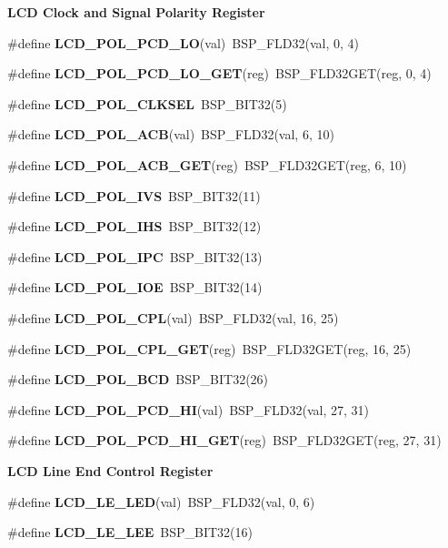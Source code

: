\begin{Indent}\textbf{ L\+CD Clock and Signal Polarity Register}\par
\begin{DoxyCompactItemize}
\item 
\#define {\bfseries L\+C\+D\+\_\+\+P\+O\+L\+\_\+\+P\+C\+D\+\_\+\+LO}(val)~B\+S\+P\+\_\+\+F\+L\+D32(val, 0, 4)
\item 
\#define {\bfseries L\+C\+D\+\_\+\+P\+O\+L\+\_\+\+P\+C\+D\+\_\+\+L\+O\+\_\+\+G\+ET}(reg)~B\+S\+P\+\_\+\+F\+L\+D32\+G\+ET(reg, 0, 4)
\item 
\#define {\bfseries L\+C\+D\+\_\+\+P\+O\+L\+\_\+\+C\+L\+K\+S\+EL}~B\+S\+P\+\_\+\+B\+I\+T32(5)
\item 
\#define {\bfseries L\+C\+D\+\_\+\+P\+O\+L\+\_\+\+A\+CB}(val)~B\+S\+P\+\_\+\+F\+L\+D32(val, 6, 10)
\item 
\#define {\bfseries L\+C\+D\+\_\+\+P\+O\+L\+\_\+\+A\+C\+B\+\_\+\+G\+ET}(reg)~B\+S\+P\+\_\+\+F\+L\+D32\+G\+ET(reg, 6, 10)
\item 
\#define {\bfseries L\+C\+D\+\_\+\+P\+O\+L\+\_\+\+I\+VS}~B\+S\+P\+\_\+\+B\+I\+T32(11)
\item 
\#define {\bfseries L\+C\+D\+\_\+\+P\+O\+L\+\_\+\+I\+HS}~B\+S\+P\+\_\+\+B\+I\+T32(12)
\item 
\#define {\bfseries L\+C\+D\+\_\+\+P\+O\+L\+\_\+\+I\+PC}~B\+S\+P\+\_\+\+B\+I\+T32(13)
\item 
\#define {\bfseries L\+C\+D\+\_\+\+P\+O\+L\+\_\+\+I\+OE}~B\+S\+P\+\_\+\+B\+I\+T32(14)
\item 
\#define {\bfseries L\+C\+D\+\_\+\+P\+O\+L\+\_\+\+C\+PL}(val)~B\+S\+P\+\_\+\+F\+L\+D32(val, 16, 25)
\item 
\#define {\bfseries L\+C\+D\+\_\+\+P\+O\+L\+\_\+\+C\+P\+L\+\_\+\+G\+ET}(reg)~B\+S\+P\+\_\+\+F\+L\+D32\+G\+ET(reg, 16, 25)
\item 
\#define {\bfseries L\+C\+D\+\_\+\+P\+O\+L\+\_\+\+B\+CD}~B\+S\+P\+\_\+\+B\+I\+T32(26)
\item 
\#define {\bfseries L\+C\+D\+\_\+\+P\+O\+L\+\_\+\+P\+C\+D\+\_\+\+HI}(val)~B\+S\+P\+\_\+\+F\+L\+D32(val, 27, 31)
\item 
\#define {\bfseries L\+C\+D\+\_\+\+P\+O\+L\+\_\+\+P\+C\+D\+\_\+\+H\+I\+\_\+\+G\+ET}(reg)~B\+S\+P\+\_\+\+F\+L\+D32\+G\+ET(reg, 27, 31)
\end{DoxyCompactItemize}
\end{Indent}
\begin{Indent}\textbf{ L\+CD Line End Control Register}\par
\begin{DoxyCompactItemize}
\item 
\#define {\bfseries L\+C\+D\+\_\+\+L\+E\+\_\+\+L\+ED}(val)~B\+S\+P\+\_\+\+F\+L\+D32(val, 0, 6)
\item 
\#define {\bfseries L\+C\+D\+\_\+\+L\+E\+\_\+\+L\+EE}~B\+S\+P\+\_\+\+B\+I\+T32(16)
\end{DoxyCompactItemize}
\end{Indent}
